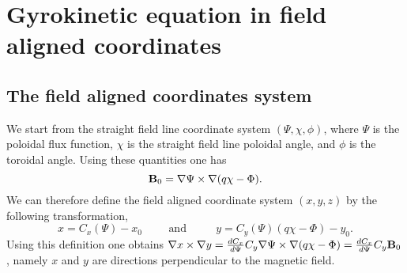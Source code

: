 \section{Gyrokinetic equation in field aligned coordinates}


\label{sec:gk_field_al_coord}

\subsection{The field aligned coordinates system}
We start from the straight field line coordinate system $(\Psi, \chi, \phi)$, where $\Psi$ is the poloidal flux function, $\chi$ is the straight field line poloidal angle, and $\phi$ is the toroidal angle. Using these quantities one has
$$\mathbf{B}_0=\nabla \Psi \times \nabla (q \chi-\Phi).$$
We can therefore define the field aligned coordinate system $(x,y,z)$ by the following transformation,
$$x=C_x(\Psi) - x_0 \hspace{1cm} \mbox{and}  \hspace{1cm}\; y=C_y(\Psi) (q \chi-\Phi)-y_0.$$
Using this definition one obtains $\nabla x \times \nabla y=\frac{d C_x}{d \Psi} C_y \nabla \Psi \times \nabla (q \chi-\Phi)=\frac{d C_x}{d \Psi} C_y  \mathbf{B}_0 $,  namely $x$ and $y$ are directions perpendicular  to the magnetic field.\\

